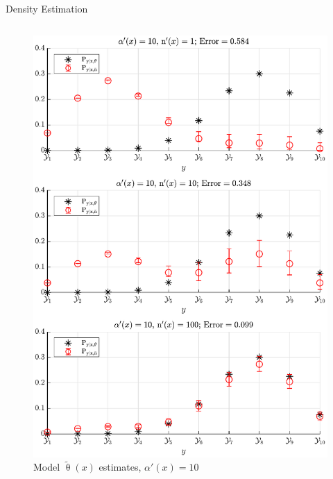\documentclass[final]{beamer}
\begin{document}
\begin{frame}{}
\begin{columns}[T]
\begin{column}{.34\linewidth}
\begin{block}{Density Estimation}
\begin{columns}[t]
\begin{column}{.5\linewidth}
\begin{figure}
\centering
\includegraphics[width=0.9\linewidth]{P_yx_error_a0_10.pdf}
\caption{Model $\tilde{\uptheta}(x)$ estimates, $\alpha'(x) = 10$}
\label{fig:P_yx_error_a0_10}
\end{figure}

\end{column}
\end{columns}



\end{block}  
    
\end{column}




\end{columns}


\end{frame}
\end{document}
